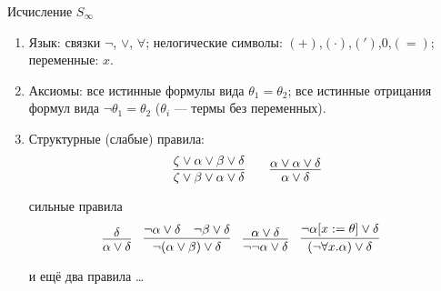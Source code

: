 \documentclass[aspectratio=169]{beamer}
\newtheorem{lmm}{Лемма}[section]
\begin{document}

%

\begin{frame}{Исчисление $S_\infty$}
\begin{enumerate}
\item Язык: связки $\neg$, $\vee$, $\forall$; нелогические символы: $(+)$,$(\cdot)$,$(')$,$0$,$(=)$; переменные: $x$.
\item Аксиомы: все истинные формулы вида $\theta_1=\theta_2$; все истинные отрицания формул вида $\neg\theta_1=\theta_2$
($\theta_i$ --- термы без переменных).
\item Структурные (слабые) правила:
$$\infer{\zeta\vee\beta\vee\alpha\vee\delta}{\zeta\vee\alpha\vee\beta\vee\delta} \quad\quad
\infer{\alpha\vee\delta}{\alpha\vee\alpha\vee\delta}$$

сильные правила
$$\infer{\alpha\vee\delta}{\delta}\quad
\infer{\neg(\alpha\vee\beta)\vee\delta}{\neg\alpha\vee\delta\quad\neg\beta\vee\delta}\quad
\infer{\neg\neg\alpha\vee\delta}{\alpha\vee\delta}\quad
\infer{(\neg\forall x.\alpha)\vee\delta}{\neg\alpha[x := \theta]\vee\delta}\quad$$

и ещё два правила \dots
\end{enumerate}
\end{frame}
\end{document}
